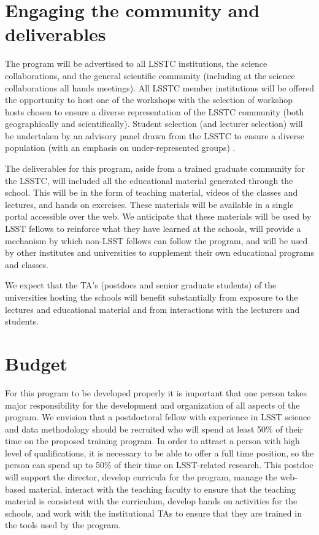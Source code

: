 \documentclass[nofootbib,floatfix,11pt]{article}
\begin{document}
\section{Engaging the community and deliverables}

The program will be advertised to all LSSTC institutions, the science collaborations, and the general scientific community (including at the science collaborations all hands meetings). All LSSTC member institutions will be offered the opportunity to host one of the workshops with the selection of workshop hosts chosen to ensure a diverse representation of the LSSTC community (both geographically and scientifically). Student selection (and lecturer selection) will be undertaken by an advisory panel drawn from the LSSTC to ensure a diverse population (with an emphasis on under-represented groups) .

The deliverables for this program, aside from a trained graduate community for the LSSTC, will included all the educational material generated through the school. This will be in the form of teaching material, videos of the classes and lectures, and hands on exercises. These materials will be available in a single portal accessible over the web. We anticipate that these materials will be used by LSST fellows to reinforce what they have learned at the schools, will provide a mechanism by which non-LSST fellows can follow the program, and will be used by other institutes and universities to supplement their own educational programs and classes. 

We expect that the TA's (postdocs and senior graduate students) of the universities hosting the schools will benefit substantially from exposure to the lectures and educational material and from interactions with the lecturers and students.

\section{Budget}

For this program to be developed properly it is important that one person takes major responsibility for the development and organization of all aspects of the program. We envision that a postdoctoral fellow with experience in LSST science and data methodology should be recruited who will spend at least 50\% of their time on the proposed training program. In order to attract a person with high level of qualifications, it is necessary to be able to offer a full time position, so the person can spend up to 50\% of their time on LSST-related research. This postdoc will support the director, develop curricula for the program, manage the web-based material, interact with the teaching faculty to ensure that the teaching material is consistent with the curriculum, develop hands on activities for the schools, and work with the institutional TAs to ensure that they are trained in the tools used by the program.
\end{document}
